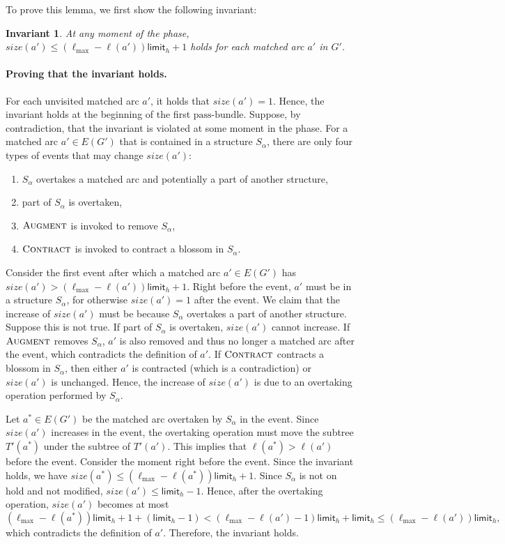 \documentclass{article}
\newcommand{\alp}{\alpha}
\newcommand{\lmax}{\ell_{\max}}
\newcommand{\bundle}{\text{pass-bundle}\xspace}
\newcommand{\limit}{\mathsf{limit}}
\newcommand{\algAugment}{\textsc{Augment}\xspace}
\newcommand{\algContract}{\textsc{Contract}\xspace}
\newtheorem{invariant}[theorem]{Invariant}
\begin{document}
To prove this lemma, we first show the following invariant:
\begin{invariant}
    At any moment of the phase, $size(a') \leq (\lmax - \ell(a'))\limit_h + 1$ holds for each matched arc $a'$ in $G'$.    
\end{invariant}

\paragraph{Proving that the invariant holds.}
For each unvisited matched arc $a'$, it holds that $size(a') = 1$.
Hence, the invariant holds at the beginning of the first $\bundle$.
Suppose, by contradiction, that the invariant is violated at some moment in the phase.
For a matched arc $a' \in E(G')$ that is contained in a structure $S_\alp$, there are only four types of events that may change $size(a')$:
\begin{enumerate}
    \item $S_\alp$ overtakes a matched arc and potentially a part of another structure,
    \item part of $S_\alp$ is overtaken,
    \item $\algAugment$ is invoked to remove $S_\alp$,
    \item $\algContract$ is invoked to contract a blossom in $S_\alp$.
\end{enumerate}
Consider the first event after which a matched arc $a' \in E(G')$ has $size(a') > (\lmax - \ell(a'))\limit_h + 1$.
Right before the event, $a'$ must be in a structure $S_\alp$, for otherwise $size(a') = 1$ after the event.
We claim that the increase of $size(a')$ must be because $S_\alp$ overtakes a part of another structure.
Suppose this is not true.
If part of $S_\alp$ is overtaken, $size(a')$ cannot increase.
If $\algAugment$ removes $S_\alp$, $a'$ is also removed and thus no longer a matched arc after the event, which contradicts the definition of $a'$.
If $\algContract$ contracts a blossom in $S_\alp$, then either $a'$ is contracted (which is a contradiction) or $size(a')$ is unchanged.
Hence, the increase of $size(a')$ is due to an overtaking operation performed by $S_\alp$.

Let $a^* \in E(G')$ be the matched arc overtaken by $S_\alp$ in the event.
Since $size(a')$ increases in the event, the overtaking operation must move the subtree $T'(a^*)$ under the subtree of $T'(a')$.
This implies that $\ell(a^*) > \ell(a')$ before the event.
Consider the moment right before the event.
Since the invariant holds, we have $size(a^*) \leq (\lmax - \ell(a^*))\limit_h + 1$.
Since $S_\alp$ is not on hold and not modified, $size(a') \leq \limit_h - 1$.
Hence, after the overtaking operation, $size(a')$ becomes at most
\[
(\lmax - \ell(a^*))\limit_h + 1 + (\limit_h - 1) < (\lmax - \ell(a') - 1)\limit_h + \limit_h \leq (\lmax - \ell(a'))\limit_h,
\]
which contradicts the definition of $a'$.
Therefore, the invariant holds.
\end{document}
